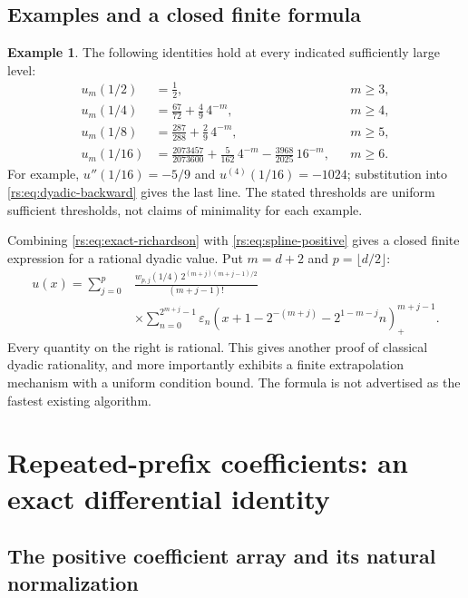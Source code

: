 \documentclass[11pt,a4paper,oneside,openany]{book}
\numberwithin{equation}{chapter}
\theoremstyle{definition}
\newtheorem{example}[theorem]{Example}
\theoremstyle{remark}
\newcommand{\eps}{\varepsilon}
\begin{document}
\section{Examples and a closed finite formula}

\begin{example}
The following identities hold at every indicated sufficiently large level:
\begin{align}
 u_m(1/2)&=\frac12, &&m\geq3,\label{rs:eq:examples-dyadic}\\
 u_m(1/4)&=\frac{67}{72}+\frac49\,4^{-m}, &&m\geq4,\nonumber\\
 u_m(1/8)&=\frac{287}{288}+\frac29\,4^{-m}, &&m\geq5,\nonumber\\
 u_m(1/16)&=\frac{2073457}{2073600}
          +\frac5{162}\,4^{-m}
          -\frac{3968}{2025}\,16^{-m}, &&m\geq6.\nonumber
\end{align}
For example, $u''(1/16)=-5/9$ and $u^{(4)}(1/16)=-1024$;
substitution into \eqref{rs:eq:dyadic-backward} gives the last line.
The stated thresholds are uniform sufficient thresholds, not claims
of minimality for each example.
\end{example}

Combining \eqref{rs:eq:exact-richardson} with
\eqref{rs:eq:spline-positive} gives a closed finite expression for a
rational dyadic value. Put $m=d+2$ and $p=\lfloor d/2\rfloor$:
\begin{equation}
\begin{split}
 u(x)=\sum_{j=0}^p &\frac{w_{p,j}(1/4)\,2^{(m+j)(m+j-1)/2}}
                         {(m+j-1)!}\\[-2pt]
 &\times\sum_{n=0}^{2^{m+j}-1}\eps_n
 \left(x+1-2^{-(m+j)}-2^{1-m-j}n\right)_+^{m+j-1}.
\end{split}
\label{rs:eq:closed-dyadic}
\end{equation}
Every quantity on the right is rational. This gives another proof
of classical dyadic rationality, and more importantly exhibits a
finite extrapolation mechanism with a uniform condition bound.
The formula is not advertised as the fastest existing algorithm.
\chapter{Repeated-prefix coefficients: an exact differential identity}\label{rs:sec:lattice}

\section{The positive coefficient array and its natural normalization}
\end{document}
